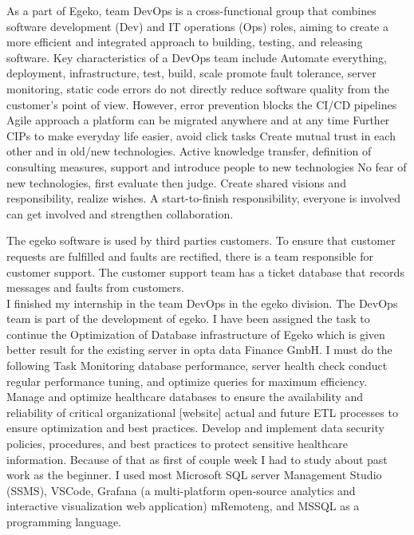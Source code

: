 As a part of Egeko, team DevOps is a cross-functional group that combines software development (Dev) and IT operations (Ops) roles, aiming to create a more efficient and integrated approach to building, testing, and releasing software. Key characteristics of a DevOps team include Automate everything, deployment, infrastructure, test, build, scale promote fault tolerance, server monitoring, static code errors do not directly reduce software quality from the customer's point of view. However, error prevention blocks the CI/CD pipelines Agile approach a platform can be migrated anywhere and at any time Further CIPs to make everyday life easier, avoid click tasks Create mutual trust in each other and in old/new technologies. Active knowledge transfer, definition of consulting measures, support and introduce people to new technologies No fear of new technologies, first evaluate then judge. Create shared visions and responsibility, realize wishes. A start-to-finish responsibility, everyone is involved can get involved and strengthen collaboration. 

The egeko software is used by third parties  customers. To ensure that customer requests are fulfilled and faults are rectified, there is a team responsible for customer support. The customer support team has a ticket database that records messages and faults from customers.\\

I finished my internship in the team DevOps in the egeko division. The DevOps team is part of the development of egeko. I have been assigned the task to continue the Optimization of Database infrastructure of Egeko which is given better result for the existing server in opta data Finance GmbH.  I must do the following Task Monitoring database performance, server health check conduct regular performance tuning, and optimize queries for maximum efficiency. Manage and optimize healthcare databases to ensure the availability and reliability of critical organizational [website] actual and future ETL processes to ensure optimization and best practices. Develop and implement data security policies, procedures, and best practices to protect sensitive healthcare information. Because of that as first of couple week I had to study about past work as the beginner. I used most Microsoft SQL server Management Studio (SSMS), VSCode, Grafana (a multi-platform open-source analytics and interactive visualization web application) mRemoteng, and MSSQL as a programming language.

